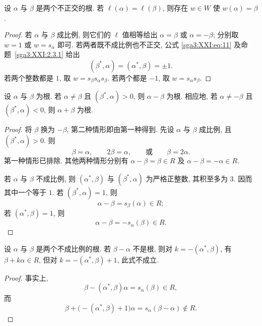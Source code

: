 \begin{corollary}\label{sga3:XXI:2.3.2}
设 \(\alpha\) 与 \(\beta\) 是两个不正交的根. 若 \(\ell(\alpha)=\ell(\beta)\), 则存在 \(w\in W\) 使 \(w(\alpha)=\beta\).
\end{corollary}
\begin{proof}
若 \(\alpha\) 与 \(\beta\) 成比例, 则它们的 \(\ell\) 值相等给出 \(\alpha=\beta\) 或 \(\alpha=-\beta\); 分别取 \(w=1\) 或 \(w=s_\alpha\) 即可. 若两者既不成比例也不正交, 公式 \eqref{sga3:XXI:eq:11} 及命题~\ref{sga3:XXI:2.3.1} 给出
\[
 (\beta^\ast,\alpha)=(\alpha^\ast,\beta)=\pm1.
\]
若两个整数都是 \(1\), 取 \(w=s_\beta s_\alpha s_\beta\). 若两个都是 \(-1\), 取 \(w=s_\alpha s_\beta\).
\end{proof}

\begin{corollary}\label{sga3:XXI:2.3.3}
设 \(\alpha\) 与 \(\beta\) 为根. 若 \(\alpha\neq\beta\) 且 \((\beta^\ast,\alpha)>0\), 则 \(\alpha-\beta\) 为根. 相应地, 若 \(\alpha\neq-\beta\) 且 \((\beta^\ast,\alpha)<0\), 则 \(\alpha+\beta\) 为根.
\end{corollary}
\begin{proof}
将 \(\beta\) 换为 \(-\beta\), 第二种情形即由第一种得到. 先设 \(\alpha\) 与 \(\beta\) 成比例, 且 \((\beta^\ast,\alpha)>0\). 则
\[
 \beta=\alpha,\qquad 2\beta=\alpha,\qquad\text{或}\qquad
 \beta=2\alpha.
\]
第一种情形已排除. 其他两种情形分别有 \(\alpha-\beta=\beta\in R\) 及 \(\alpha-\beta=-\alpha\in R\).

若 \(\alpha\) 与 \(\beta\) 不成比例, 则 \((\alpha^\ast,\beta)\) 与 \((\beta^\ast,\alpha)\) 为严格正整数, 其积至多为 \(3\). 因而其中一个等于 \(1\). 若 \((\beta^\ast,\alpha)=1\), 则
\[
 \alpha-\beta=s_\beta(\alpha)\in R;
\]
若 \((\alpha^\ast,\beta)=1\), 则
\[
 \alpha-\beta=-s_\alpha(\beta)\in R.
\]
\end{proof}

\begin{lemma}\label{sga3:XXI:2.3.4}
设 \(\alpha\) 与 \(\beta\) 是两个不成比例的根. 若 \(\beta-\alpha\) 不是根, 则对 \(k=-(\alpha^\ast,\beta)\), 有 \(\beta+k\alpha\in R\), 但对 \(k=-(\alpha^\ast,\beta)+1\), 此式不成立.
\end{lemma}
\begin{proof}
事实上,
\[
 \beta-(\alpha^\ast,\beta)\alpha=s_\alpha(\beta)\in R,
\]
而
\[
 \beta+\bigl(-(\alpha^\ast,\beta)+1\bigr)\alpha
 =s_\alpha(\beta-\alpha)\notin R.
\]
\end{proof}

